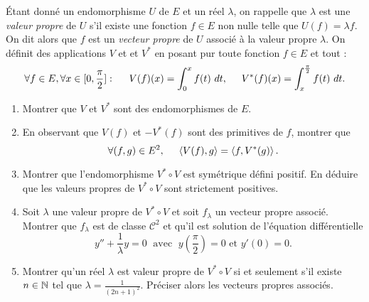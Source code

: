 \'Etant donné un endomorphisme $U$ de $E$ et un réel $\lambda$, on rappelle que $\lambda$ est une \emph{valeur propre} de $U$ s'il existe une fonction $f\in E$ non nulle telle que $U(f) = \lambda f$. On dit alors que $f$ est un \emph{vecteur propre} de $U$ associé à la valeur propre $\lambda$.\newline
On définit des applications $V$ et et $V^{*}$ en posant pur toute fonction $f\in E$ et tout :
\begin{displaymath}
\forall f\in E, \forall x\in [0,\frac{\pi}{2}]:\hspace{0.5cm}
V(f)(x) = \int_{0}^{x}f(t)\ dt, \hspace{0.5cm} V^{*}(f)(x) = \int_{x}^{\frac{\pi}{2}}f(t)\ dt.
\end{displaymath}
\begin{enumerate}
\item Montrer que $V$ et $V^{*}$ sont des endomorphismes de $E$. 

\item En observant que $V(f)$ et $-V^{*}(f)$ sont des primitives de $f$, montrer que
\begin{displaymath}
\forall (f,g)\in E^2, \hspace{0.5cm} \left\langle {V(f)} , {g} \right\rangle = \left\langle {f} , {V^{*}(g)} \right\rangle. 
\end{displaymath}

\item Montrer que l'endomorphisme $V^{*}\circ V$ est symétrique défini positif. En déduire que les valeurs propres de $V^{*}\circ V$ sont strictement positives. 

\item Soit $\lambda$ une valeur propre de $V^{*}\circ V$ et soit $f_{\lambda}$ un vecteur propre associé. Montrer que $f_\lambda$ est de classe $\mathcal{C}^{2}$ et qu'il est solution de l'équation différentielle 
\begin{displaymath}
y''+\frac{1}{\lambda}y=0\; \text{ avec }\; y(\frac{\pi}{2}) = 0 \text{ et } y'(0) = 0 .
\end{displaymath}

\item Montrer qu'un réel $\lambda$ est valeur propre de $V^{*}\circ V$ si et seulement s'il existe $n\in \mathbb{N}$ tel que $\lambda = \frac{1}{(2n+1)^{2}}$. Préciser alors les vecteurs propres associés.
\end{enumerate}

